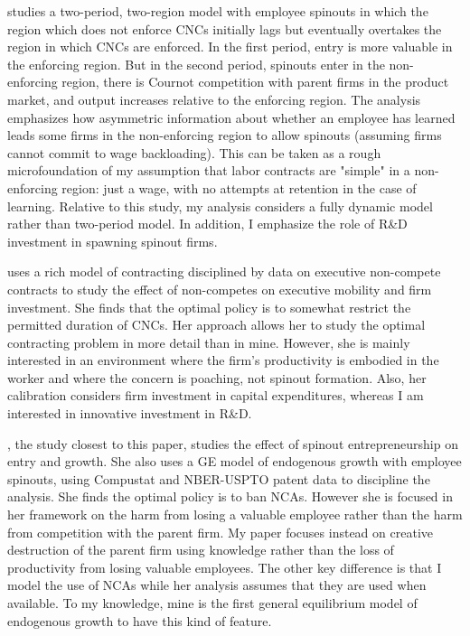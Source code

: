 \documentclass[11pt,english]{article}
\begin{document}
\cite{franco_covenants_2008} studies a two-period, two-region model with employee spinouts in which the region which does not enforce CNCs initially lags but eventually overtakes the region in which CNCs are enforced. In the first period, entry is more valuable in the enforcing region. But in the second period, spinouts enter in the non-enforcing region, there is Cournot competition with parent firms in the product market, and output increases relative to the enforcing region. The analysis emphasizes how asymmetric information about whether an employee has learned leads some firms in the non-enforcing region to allow spinouts (assuming firms cannot commit to wage backloading). This can be taken as a rough microfoundation of my assumption that labor contracts are "simple" in  a non-enforcing region: just a wage, with no attempts at retention in the case of learning. Relative to this study, my analysis considers a fully dynamic model rather than two-period model. In addition, I emphasize the role of R\&D investment in spawning spinout firms.

\cite{shi_restrictions_2018} uses a rich model of contracting disciplined by data on executive non-compete contracts to study the effect of non-competes on executive mobility and firm investment. She finds that the optimal policy is to somewhat restrict the permitted duration of CNCs. Her approach allows her to study the optimal contracting problem in more detail than in mine. However, she is mainly interested in an environment where the firm's productivity is embodied in the worker and where the concern is poaching, not spinout formation. Also, her calibration considers firm investment in capital expenditures, whereas I am interested in innovative investment in R\&D.

\cite{baslandze_spinout_2019}, the study closest to this paper, studies the effect of spinout entrepreneurship on entry and growth. She also uses a GE model of endogenous growth with employee spinouts, using Compustat and NBER-USPTO patent data to discipline the analysis. She finds the optimal policy is to ban NCAs. However she is focused in her framework on the harm from losing a valuable employee rather than the harm from competition with the parent firm. My paper focuses instead on creative destruction of the parent firm using knowledge rather than the loss of productivity from losing valuable employees.  The other key difference is that I model the use of NCAs while her analysis assumes that they are used when available. To my knowledge, mine is the first general equilibrium model of endogenous growth to have this kind of feature.
\end{document}
